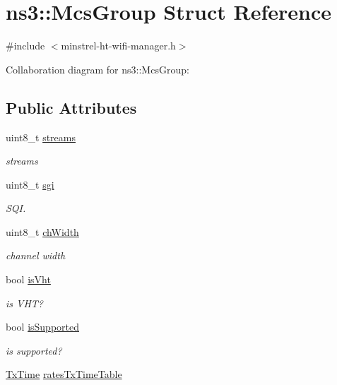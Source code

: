 \hypertarget{structns3_1_1McsGroup}{}\section{ns3\+:\+:Mcs\+Group Struct Reference}
\label{structns3_1_1McsGroup}


{\ttfamily \#include $<$minstrel-\/ht-\/wifi-\/manager.\+h$>$}



Collaboration diagram for ns3\+:\+:Mcs\+Group\+:
\subsection*{Public Attributes}
\begin{DoxyCompactItemize}
\item 
uint8\+\_\+t \hyperlink{structns3_1_1McsGroup_aef84b3da17bc770184cb36a48c874583}{streams}
\begin{DoxyCompactList}\small\item\em streams \end{DoxyCompactList}\item 
uint8\+\_\+t \hyperlink{structns3_1_1McsGroup_ab8ec2c393f734b2f4ca08150eb3f83f4}{sgi}
\begin{DoxyCompactList}\small\item\em S\+QI. \end{DoxyCompactList}\item 
uint8\+\_\+t \hyperlink{structns3_1_1McsGroup_ab314dfb9cf5c1b2c6d0e61b88caace5d}{ch\+Width}
\begin{DoxyCompactList}\small\item\em channel width \end{DoxyCompactList}\item 
bool \hyperlink{structns3_1_1McsGroup_a4109174f594db5a213631c4204add485}{is\+Vht}
\begin{DoxyCompactList}\small\item\em is V\+HT? \end{DoxyCompactList}\item 
bool \hyperlink{structns3_1_1McsGroup_ae80bed20d83ea94500f6c4afddf41bfc}{is\+Supported}
\begin{DoxyCompactList}\small\item\em is supported? \end{DoxyCompactList}\item 
\hyperlink{namespacens3_af8fcd77dacc9b48b88a69a7674cd8e07}{Tx\+Time} \hyperlink{structns3_1_1McsGroup_a13ede0696c8ce7c764c8ba972ed3bdd1}{rates\+Tx\+Time\+Table}

\end{DoxyCompactItemize}
